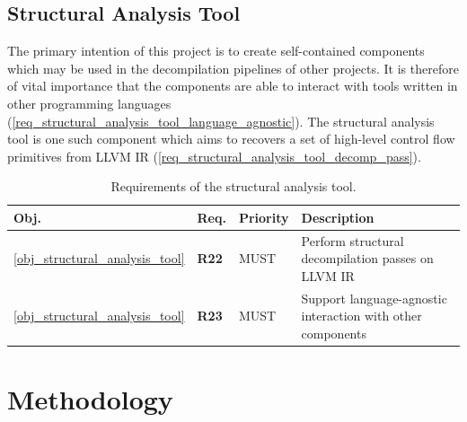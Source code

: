 \documentclass[12pt, a4paper]{article}
\makeatletter
\newcommand{\customlabel}[2]{
	\hypertarget{#1}{#2}
	\protected@write \@auxout {}{\string \newlabel {#1}{{#2}{\thepage}{#2}{#1}{}} }
}
\makeatother
\begin{document}

\subsection{Structural Analysis Tool}

The primary intention of this project is to create self-contained components which may be used in the decompilation pipelines of other projects. It is therefore of vital importance that the components are able to interact with tools written in other programming languages (\ref{req_structural_analysis_tool_language_agnostic}). The structural analysis tool is one such component which aims to recovers a set of high-level control flow primitives from LLVM IR (\ref{req_structural_analysis_tool_decomp_pass}).

\begin{table}[htbp]
	\begin{center}
		\begin{tabular}{|l|l|l|l|}
			\hline
			Obj. & Req. & Priority & Description \\
			\hline
			\ref{obj_structural_analysis_tool} & \customlabel{req_structural_analysis_tool_decomp_pass}{\textbf{R22}} & MUST & Perform structural decompilation passes on LLVM IR \\
			\ref{obj_structural_analysis_tool} & \customlabel{req_structural_analysis_tool_language_agnostic}{\textbf{R23}} & MUST & Support language-agnostic interaction with other components \\
			\hline
		\end{tabular}
	\end{center}
	\caption{Requirements of the structural analysis tool.}
\end{table}

\pagebreak


\section{Methodology}


\end{document}
